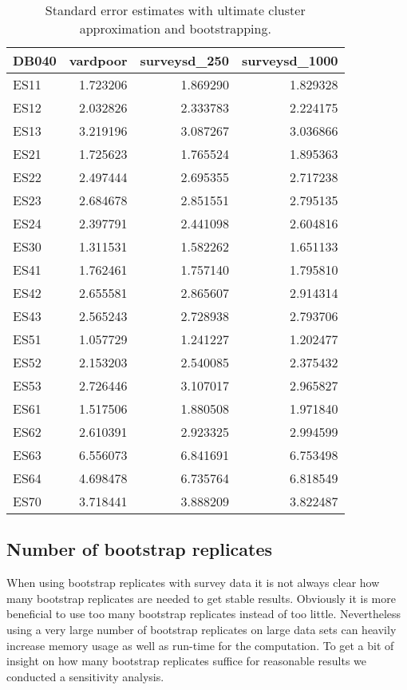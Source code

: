 \documentclass{scrartcl}\usepackage[]{graphicx}\usepackage[]{color}
\begin{document}
\begin{table}

\caption{\label{tab:compvard}Standard error estimates with ultimate cluster approximation and bootstrapping.}
\centering
\begin{tabular}[t]{lrrr}
\toprule
DB040 & vardpoor & surveysd\_250 & surveysd\_1000\\
\midrule
ES11 & 1.723206 & 1.869290 & 1.829328\\
ES12 & 2.032826 & 2.333783 & 2.224175\\
ES13 & 3.219196 & 3.087267 & 3.036866\\
ES21 & 1.725623 & 1.765524 & 1.895363\\
ES22 & 2.497444 & 2.695355 & 2.717238\\
\addlinespace
ES23 & 2.684678 & 2.851551 & 2.795135\\
ES24 & 2.397791 & 2.441098 & 2.604816\\
ES30 & 1.311531 & 1.582262 & 1.651133\\
ES41 & 1.762461 & 1.757140 & 1.795810\\
ES42 & 2.655581 & 2.865607 & 2.914314\\
\addlinespace
ES43 & 2.565243 & 2.728938 & 2.793706\\
ES51 & 1.057729 & 1.241227 & 1.202477\\
ES52 & 2.153203 & 2.540085 & 2.375432\\
ES53 & 2.726446 & 3.107017 & 2.965827\\
ES61 & 1.517506 & 1.880508 & 1.971840\\
\addlinespace
ES62 & 2.610391 & 2.923325 & 2.994599\\
ES63 & 6.556073 & 6.841691 & 6.753498\\
ES64 & 4.698478 & 6.735764 & 6.818549\\
ES70 & 3.718441 & 3.888209 & 3.822487\\
\bottomrule
\end{tabular}
\end{table}




\subsection{Number of bootstrap replicates}
When using bootstrap replicates with survey data it is not always clear how many bootstrap replicates are needed to get stable results.
Obviously it is more beneficial to use too many bootstrap replicates instead of too little. Nevertheless using a very large number of bootstrap replicates on large data sets can heavily increase memory usage as well as run-time for the computation. To get a bit of insight on how many bootstrap replicates suffice for reasonable results we conducted a sensitivity analysis.
\end{document}

